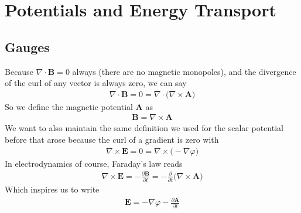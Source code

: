 \section{Potentials and Energy Transport}


\subsection{Gauges}
Because $\nabla\cdot\textbf{B} = 0$  always (there are no magnetic monopoles), and the divergence of the curl of any vector is always zero, we can say
\begin{align}
    \nabla\cdot\textbf{B} = 0 = \nabla\cdot\Big(\nabla\times\textbf{A}\Big) 
\end{align}
So we define the magnetic potential $\textbf{A}$ as
\begin{align}
    \textbf{B} = \nabla\times\textbf{A}
\end{align}
We want to also maintain the same definition we used for the scalar potential before that arose because the curl of a gradient is zero with
\begin{align}
    \nabla\times\textbf{E} = 0 = \nabla\times \Big(-\nabla\varphi\Big)
\end{align}
In electrodynamics of course, Faraday's law reads
\begin{align}
    \nabla\times \textbf{E} = -\frac{\partial\textbf{B}}{\partial t} = -\frac{\partial}{\partial t}\Big(\nabla\times\textbf{A}\Big)
\end{align}
Which inspires us to write
\begin{align}
    \textbf{E} = -\nabla\varphi -\frac{\partial \textbf{A}}{\partial t}
\end{align}

